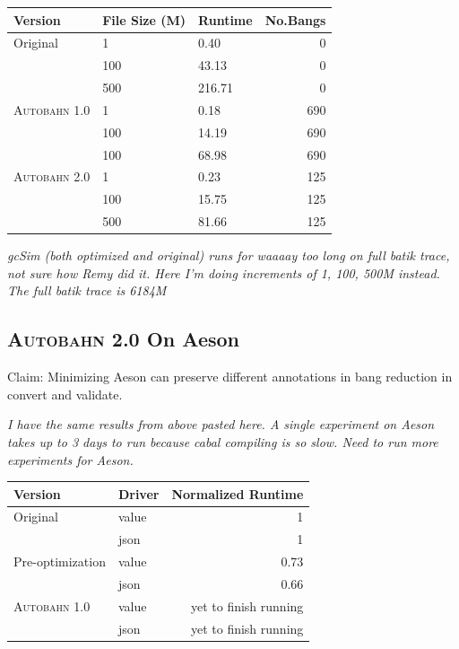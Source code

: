 \documentclass[format=sigplan]{acmart}
\newcommand{\Ao}[0]{\textsc{Autobahn 1.0}}
\newcommand{\At}[0]{\textsc{Autobahn 2.0}}
\begin{document}
\begin{tabular}{lllr}
\hline
Version   & File Size (M) & Runtime & No.Bangs \\
\hline
Original      & 1   &   0.40	 & 0   \\
          & 100        & 43.13      & 0 \\
       & 500     &  216.71 & 0 \\
\Ao{}       & 1     & 0.18    &  690\\
          & 100        & 14.19 &  690\\
                 & 100        & 68.98	& 690\\
\At{}      & 1   &  0.23 & 125    \\
          & 100        & 15.75 & 125      \\
       & 500    & 81.66 & 125    \\

\hline
\end{tabular}

\textit{gcSim (both optimized and original) runs for waaaay too long on full batik trace, not sure how Remy did it. Here I'm doing increments of 1, 100, 500M instead. The full batik trace is 6184M}
 
\subsection{\At{} On Aeson}
 
Claim: Minimizing Aeson can preserve different annotations in bang reduction in convert and validate.

\textit{I have the same results from above pasted here. A single experiment on Aeson takes up to 3 days to run because cabal compiling is so slow. Need to run more experiments for Aeson.}

\begin{tabular}{llr}
\hline
Version   & Driver & Normalized Runtime \\
\hline
Original      & value   & 1     \\
          & json        & 1      \\
Pre-optimization       & value     & 0.73     \\
          & json        & 0.66	\\
\Ao{}       & value     & yet to finish running      \\
          & json        & yet to finish running	\\

\hline
\end{tabular}
\end{document}
